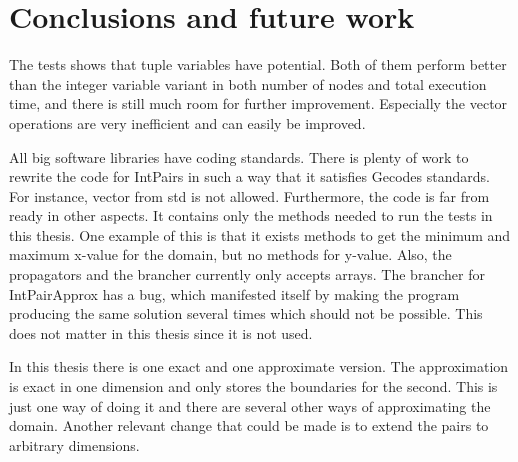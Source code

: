 \documentclass[a4paper,11pt]{article}
\begin{document}
\section{Conclusions and future work}
The tests shows that tuple variables have potential. Both of them perform better than the integer variable variant in both number of nodes and total execution time, and there is still much room for further improvement. Especially the vector operations are very inefficient and can easily be improved.

All big software libraries have coding standards. There is plenty of work to rewrite the code for IntPairs in such a way that it satisfies Gecodes standards. For instance, vector from std is not allowed. Furthermore, the code is far from ready in other aspects. It contains only the methods needed to run the tests in this thesis. One example of this is that it exists methods to get the minimum and maximum x-value for the domain, but no methods for y-value. Also, the propagators and the brancher currently only accepts arrays. The brancher for IntPairApprox has a bug, which manifested itself by making the program producing the same solution several times which should not be possible. This does not matter in this thesis since it is not used.

In this thesis there is one exact and one approximate version. The approximation is exact in one dimension and only stores the boundaries for the second. This is just one way of doing it and there are several other ways of approximating the domain. Another relevant change that could be made is to extend the pairs to arbitrary dimensions.







%
%
%
%
\end{document}
